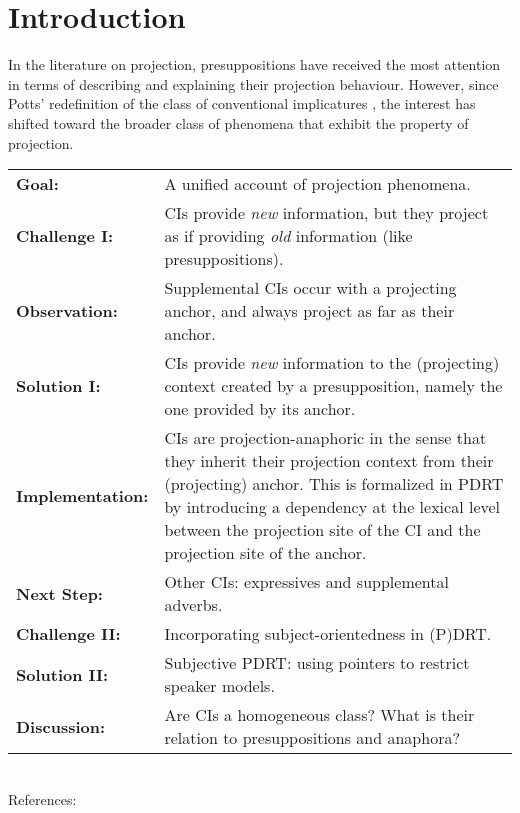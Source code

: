 \section{Introduction}\label{Introduction}

In the literature on projection, presuppositions have received the most
attention in terms of describing and explaining their projection behaviour.
However, since Potts' redefinition of the class of conventional implicatures
\citep{potts2003logic,potts2005logic}, the interest has shifted toward the
broader class of phenomena that exhibit the property of projection.

\bigskip
\noindent
\begin{tabular}{p{} p{}}
          \textbf{Goal:} & A unified account of projection phenomena.\\
   \textbf{Challenge I:} & CIs provide \textit{new} information, but they
                           project as if providing \textit{old} information
                           (like presuppositions).\\
   \textbf{Observation:} & Supplemental CIs occur with a projecting anchor,
                           and always project as far as their anchor.\\
    \textbf{Solution I:} & CIs provide \textit{new} information to the
                           (projecting) context created by a presupposition,
                           namely the one provided by its anchor.\\
\textbf{Implementation:} & CIs are projection-anaphoric in the sense that
                           they inherit their projection context from their
                           (projecting) anchor. This is formalized in PDRT
                           \citep{venhuizen2013iwcs} by introducing a
                           dependency at the lexical level between the
                           projection site of the CI and the projection site
                           of the anchor.\\
     \textbf{Next Step:} & Other CIs: expressives and supplemental adverbs.\\
  \textbf{Challenge II:} & Incorporating subject-orientedness in (P)DRT.\\
   \textbf{Solution II:} & Subjective PDRT: using pointers to restrict speaker
                           models.\\
    \textbf{Discussion:} & Are CIs a homogeneous class? What is their relation
                           to presuppositions and anaphora?\\
\end{tabular}\\

References: \citep{delgobbo2003appositives,potts2005logic,amaral2007review,
  nouwen2007appositives,harris2009perspective,heringa2012appositional,
  schlenker2013supplements,nouwen2014note,potts2013presupposition}





